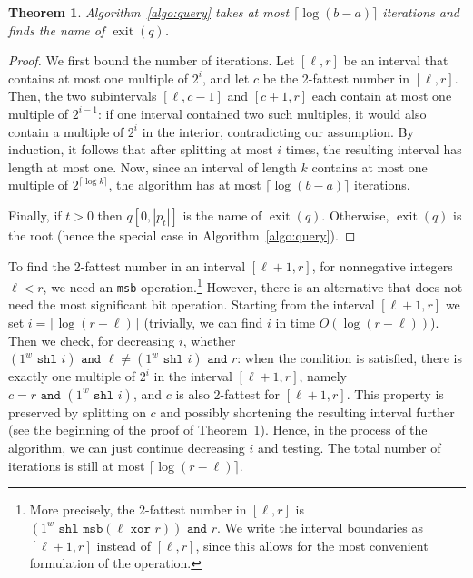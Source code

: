 \documentclass[a4paper,11pt]{article}
\newtheorem{theorem} {Theorem}[section]
\newcommand{\?}{\mskip1.5mu}
\DeclareMathOperator{\exit}{exit}
\begin{document}
\begin{theorem}
\label{thm:correctnessfbs}
Algorithm~\ref{algo:query} takes at most $\lceil\log(b-a)\rceil$
iterations
and finds the name of $\exit(q)$.
\end{theorem}

\begin{proof}
We first bound the number of iterations. Let 
$[\ell, r]$ be an interval that contains at most one multiple of 
$2^i$, and let $c$ be the 2-fattest number in $[\ell, r]$. Then, 
the two subintervals $[\ell, c - 1]$ and $[c + 1, r]$ each contain 
at most one multiple of $2^{i-1}$: if one interval contained two such 
multiples, it would also contain a multiple of $2^i$
in the interior, contradicting our assumption.
By induction, it follows that after splitting
at most $i$ times, the resulting interval has length at most one. 
Now, since an interval of length $k$ contains at most one multiple of 
$2^{\lceil\log k\rceil}$, the algorithm
has at most $\lceil\log(b-a)\rceil$ iterations.

Finally, if $t > 0$ then $q[0, |p_t|]$ is the name of $\exit(q)$.
Otherwise, $\exit(q)$ is the root (hence the special case in 
Algorithm~\ref{algo:query}).
\end{proof}

To find the 2-fattest number in an interval $[\ell + 1, r]$, for 
nonnegative integers $\ell < r$, we need 
an \texttt{msb}-operation.\footnote{More precisely, the 
2-fattest number in $[\ell, r]$ is 
$(1^w \texttt{ shl } 
\texttt{msb}(\ell \texttt{ xor } r)) \texttt{ and } r$. 
We write the interval boundaries as $[\ell +1 , r]$ instead of
$[\ell, r]$, since this allows for the most convenient formulation
of the operation.}
However, there is an alternative that does not need the most 
significant bit operation.  Starting from the interval $[\ell + 1, r]$
we set $i = \lceil\log(r - \ell)\rceil$ (trivially, we can find $i$ 
in time $O(\log(r -\ell))$).
Then we check, for decreasing $i$, whether 
$(1^w \texttt{ shl } i)\texttt{ and } \ell \neq 
 (1^w \texttt{ shl } i) \texttt{ and } r$: 
when the condition is satisfied, there is exactly one multiple of 
$2^i$ in the interval $[\ell + 1, r]$, 
namely $c= r \texttt{ and }  (1^w \texttt{ shl } i)$, and
$c$ is also 2-fattest for $[\ell + 1, r]$. This property is preserved 
by splitting on $c$ and possibly shortening the resulting interval
further (see the beginning of the proof of 
Theorem~\ref{thm:correctnessfbs}). Hence, in the process of
the algorithm, we can just continue decreasing $i$ and testing. 
The total number of iterations is still at most 
$\lceil\log(r-\ell)\rceil$.
\end{document}
